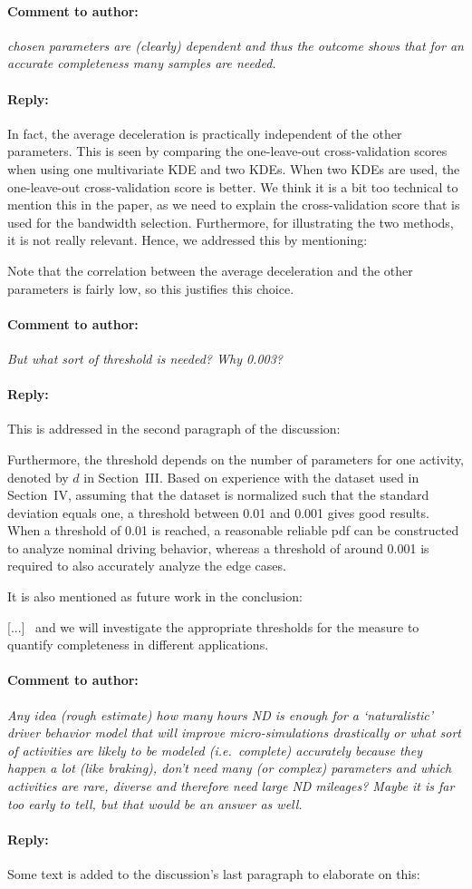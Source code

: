 \documentclass[10pt,final,a4paper,oneside,onecolumn]{article}
\newcommand{\toauthor}{\paragraph*{Comment to author:} \itshape}
\newcommand{\fromauthor}{\paragraph*{Reply:} \normalfont}
\newcommand{\cstart}{\color{red}}
\newcommand{\cend}{\color{black}}
\newcommand{\additionend}[1]{\color{black}[#1]\color{red}}
\newcommand{\addition}[1]{\additionend{#1}\ }
\begin{document}
\toauthor chosen parameters are (clearly) dependent and thus the outcome shows that for an accurate completeness many samples are needed. 

\fromauthor In fact, the average deceleration is practically independent of the other parameters. This is seen by comparing the one-leave-out cross-validation scores when using one multivariate KDE and two KDEs. When two KDEs are used, the one-leave-out cross-validation score is better. We think it is a bit too technical to mention this in the paper, as we need to explain the cross-validation score that is used for the bandwidth selection. Furthermore, for illustrating the two methods, it is not really relevant. Hence, we addressed this by mentioning: 

\cstart
Note that the correlation between the average deceleration and the other parameters is fairly low, so this justifies this choice.
\cend

\toauthor But what sort of threshold is needed? Why 0.003? 

\fromauthor This is addressed in the second paragraph of the discussion:

\cstart 
Furthermore, the threshold depends on the number of parameters for one activity, denoted by $d$ in Section~III. Based on experience with the dataset used in Section~IV, assuming that the dataset is normalized such that the standard deviation equals one, a threshold between 0.01 and 0.001 gives good results. When a threshold of 0.01 is reached, a reasonable reliable pdf can be constructed to analyze nominal driving behavior, whereas a threshold of around 0.001 is required to also accurately analyze the edge cases.
\cend

It is also mentioned as future work in the conclusion:

\cstart \addition{...} and we will investigate the appropriate thresholds for the measure to quantify completeness in different applications. \cend

\toauthor Any idea (rough estimate) how many hours ND is enough for a `naturalistic' driver behavior model that will improve micro-simulations drastically or what sort of activities are likely to be modeled (i.e.\ complete) accurately because they happen a lot (like braking), don't need many (or complex) parameters and which activities are rare, diverse and therefore need large ND mileages? Maybe it is far too early to tell, but that would be an answer as well. 

\fromauthor Some text is added to the discussion's last paragraph to elaborate on this:
\end{document}
